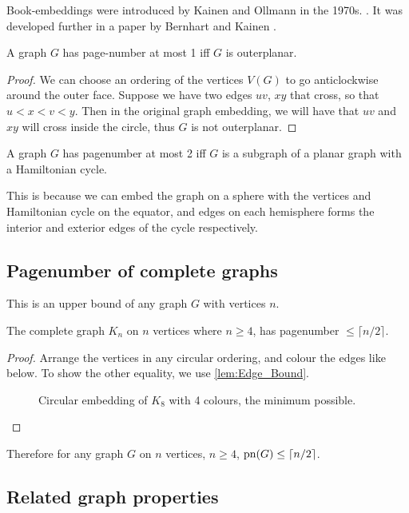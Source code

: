 Book-embeddings were introduced by Kainen and Ollmann in the 1970s. \cite{kainenRecentResultsTopological1974, ollmannBookThicknessVarious1973}. It was developed further in a paper by Bernhart and Kainen \cite{bernhartBookThicknessGraph1979}. 
\begin{lemma}\label{lem:Pagenumber_1}
	A graph $G$ has page-number at most 1 iff $G$ is outerplanar.
\end{lemma}
\begin{proof}
	We can choose an ordering of the vertices $V(G)$ to go anticlockwise around the outer face. Suppose we have two edges $uv$, $xy$ that cross, so that $u < x < v < y$. Then in the original graph embedding, we will have that $uv$ and $xy$ will cross inside the circle, thus $G$ is not outerplanar. 
\end{proof}
\begin{lemma}\label{lem:Pagenumber_2}
	A graph $G$ has pagenumber at most 2 iff $G$ is a subgraph of a planar graph with a Hamiltonian cycle.
\end{lemma}
This is because we can embed the graph on a sphere with the vertices and Hamiltonian cycle on the equator, and edges on each hemisphere forms the interior and exterior edges of the cycle respectively.

\subsection{Pagenumber of complete graphs}\label{ssec:Pagenumber_Complete_Graphs}
This is an upper bound of any graph $G$ with vertices $n$. 
\begin{theorem}\label{thm:Pagenumber_Complete_Graph}
	The complete graph $K_n$ on $n$ vertices where $n \geq 4$, has pagenumber $ \leq \lceil n/2 \rceil$. 
\end{theorem}
\begin{proof}
	Arrange the vertices in any circular ordering, and colour the edges like below. To show the other equality, we use \cref{lem:Edge_Bound}.
	\begin{figure}[h]
		\caption{Circular embedding of $K_8$ with 4 colours, the minimum possible.}
		\centering
		
		\label{fig:k8 coloured with colours}
	\end{figure}
\end{proof}
Therefore for any graph $G$ on $n$ vertices, $n \geq 4$, $\text{pn}(G) \leq \lceil n/2 \rceil$. 
\subsection{Related graph properties}\label{ssec:Related_Properties}

